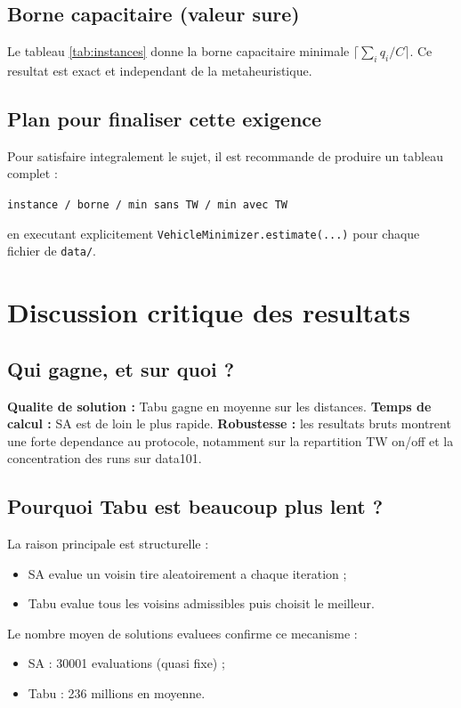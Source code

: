 \documentclass[12pt,a4paper]{report}
\begin{document}
\section{Borne capacitaire (valeur sure)}
Le tableau \ref{tab:instances} donne la borne capacitaire minimale
$\lceil\sum_i q_i/C\rceil$.
Ce resultat est exact et independant de la metaheuristique.

\section{Plan pour finaliser cette exigence}
Pour satisfaire integralement le sujet,
il est recommande de produire un tableau complet :
\begin{center}
\texttt{instance / borne / min sans TW / min avec TW}
\end{center}
en executant explicitement \texttt{VehicleMinimizer.estimate(...)}
pour chaque fichier de \texttt{data/}.

\chapter{Discussion critique des resultats}

\section{Qui gagne, et sur quoi ?}
\textbf{Qualite de solution :} Tabu gagne en moyenne sur les distances.
\textbf{Temps de calcul :} SA est de loin le plus rapide.
\textbf{Robustesse :} les resultats bruts montrent une forte dependance au protocole,
notamment sur la repartition TW on/off et la concentration des runs sur data101.

\section{Pourquoi Tabu est beaucoup plus lent ?}
La raison principale est structurelle :
\begin{itemize}[leftmargin=1.2cm]
  \item SA evalue un voisin tire aleatoirement a chaque iteration ;
  \item Tabu evalue tous les voisins admissibles puis choisit le meilleur.
\end{itemize}

Le nombre moyen de solutions evaluees confirme ce mecanisme :
\begin{itemize}[leftmargin=1.2cm]
  \item SA : 30001 evaluations (quasi fixe) ;
  \item Tabu : 236 millions en moyenne.
\end{itemize}
\end{document}
